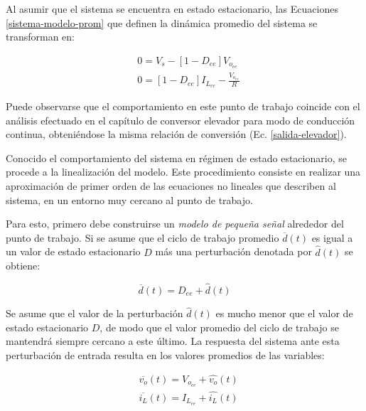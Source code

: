 Al asumir que el sistema se encuentra en estado estacionario, las Ecuaciones \ref{sistema-modelo-prom} que definen la dinámica promedio del sistema se transforman en:

\begin{equation}
  \begin{split}
    & 0 = V_s - \left[ 1-D_{ee} \right] V_{o_{ee}}
    \\
    & 0 = \left[ 1-D_{ee} \right] I_{L_{ee}} - \frac{V_{o_{ee}}}{R}
  \end{split}
  \label{sistema-modelo-ee}
\end{equation}

Puede observarse que el comportamiento en este punto de trabajo coincide con el análisis efectuado en el capítulo de conversor elevador para modo de conducción continua, obteniéndose la misma relación de conversión (Ec. \ref{salida-elevador}).

Conocido el comportamiento del sistema en régimen de estado estacionario, se procede a la linealización del modelo. Este procedimiento consiste en realizar una aproximación de primer orden de las ecuaciones no lineales que describen al sistema, en un entorno muy cercano al punto de trabajo.

Para esto, primero debe construirse un \emph{modelo de pequeña señal} alrededor del punto de trabajo. Si se asume que el ciclo de trabajo promedio $\overline{d}(t)$ es igual a un valor de estado estacionario $D$ más una perturbación denotada por $\hat{d}(t)$ se obtiene:

\begin{equation}
  \overline{d}(t) = D_{ee} + \hat{d}(t)
  \label{ciclo-lineal} 
\end{equation}

Se asume que el valor de la perturbación $\hat{d}(t)$ es mucho menor que el valor de estado estacionario $D$, de modo que el valor promedio del ciclo de trabajo se mantendrá siempre cercano a este último. La respuesta del sistema ante esta perturbación de entrada resulta en los valores promedios de las variables:

\begin{equation}
  \begin{split}
    & \overline{v_o}(t) = V_{o_{ee}} + \hat{v_o}(t)
    \\
    & \overline{i_L}(t) = I_{L_{ee}} + \hat{i_L}(t)
  \end{split}
  \label{sistema-modelo-prom-ee}
\end{equation}

